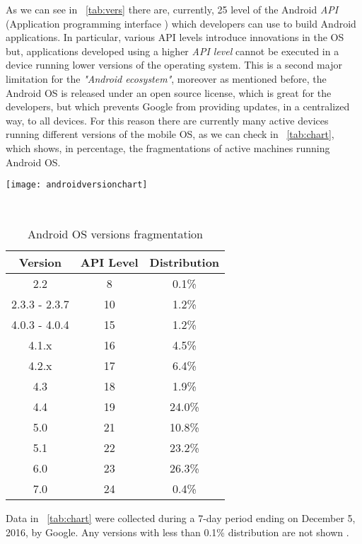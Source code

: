  As we can see in \tablename~\ref{tab:vers} there are, currently, 25 level of the Android \textit{API} (Application programming interface
 ) which developers can use to build Android applications. In particular, various API levels introduce innovations in the OS but, applications developed using a higher \textit{API level} cannot be executed in a device running lower versions of the operating system. This is a second major limitation for the \textit{"Android ecosystem"}, moreover as mentioned before, the Android OS is released under an open source license, which is great for the developers, but which prevents Google from providing updates, in a centralized way, to all devices. For this reason there are currently many active devices running different versions of the mobile OS, as we can check in \tablename~\ref{tab:chart}, which shows, in percentage, the fragmentations of active machines running Android OS.\\
 \begin{table}[h]
 	\caption{Android OS versions fragmentation}
 	\label{tab:chart}
 	
 	\begin{minipage}{0.5\textwidth}
 		\centering
 		\texttt{[image: androidversionchart]}
 		\label{2.2:Android fragmentation chart}
 		
 	\end{minipage}
 ~\hfill~
 \begin{minipage}{0.5 \textwidth}
 	\centering
 	\begin{tabular}{ccc}
 		\toprule
 		\textbf{Version}  & \textbf{API Level} & \textbf{Distribution}\\
 		\midrule
 		2.2 & 8 & 0.1\% \\
 		2.3.3 - 2.3.7 & 10 & 1.2\% \\
 		4.0.3 - 4.0.4 & 15 & 1.2\% \\
 		4.1.x & 16 & 4.5\% \\
 		4.2.x & 17 & 6.4\% \\
 		4.3 & 18 & 1.9\% \\
 		4.4 & 19 & 24.0\% \\
 		5.0 & 21 & 10.8\% \\
 		5.1 & 22 & 23.2\% \\
 		6.0 & 23 & 26.3\% \\
 		7.0 & 24 & 0.4\% \\
 		\bottomrule
 	\end{tabular}
\end{minipage}
 \end{table}
Data in \tablename~\ref{tab:chart} were collected during a 7-day period ending on December 5, 2016, by Google. Any versions with less than 0.1\% distribution are not shown \cite{devandroiddash}.
